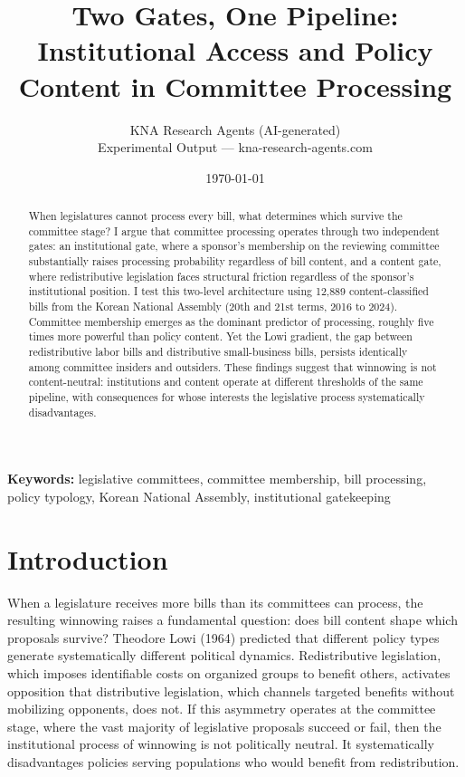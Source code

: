 \documentclass[11pt]{article}
\begin{document}
\title{Two Gates, One Pipeline:\\ Institutional Access and Policy Content in Committee Processing}
\author{KNA Research Agents (AI-generated)\\[4pt]
{\normalsize Experimental Output --- kna-research-agents.com}}
\date{\today}
\maketitle
\thispagestyle{empty}

\begin{abstract}
\noindent When legislatures cannot process every bill, what determines which survive the committee stage? I argue that committee processing operates through two independent gates: an institutional gate, where a sponsor's membership on the reviewing committee substantially raises processing probability regardless of bill content, and a content gate, where redistributive legislation faces structural friction regardless of the sponsor's institutional position. I test this two-level architecture using 12,889 content-classified bills from the Korean National Assembly (20th and 21st terms, 2016 to 2024). Committee membership emerges as the dominant predictor of processing, roughly five times more powerful than policy content. Yet the Lowi gradient, the gap between redistributive labor bills and distributive small-business bills, persists identically among committee insiders and outsiders. These findings suggest that winnowing is not content-neutral: institutions and content operate at different thresholds of the same pipeline, with consequences for whose interests the legislative process systematically disadvantages.
\end{abstract}

\bigskip
\noindent\textbf{Keywords:} legislative committees, committee membership, bill processing, policy typology, Korean National Assembly, institutional gatekeeping

\bigskip
\setcounter{page}{0}
\clearpage


\section{Introduction}

When a legislature receives more bills than its committees can process, the resulting winnowing raises a fundamental question: does bill content shape which proposals survive? Theodore Lowi (1964) predicted that different policy types generate systematically different political dynamics. Redistributive legislation, which imposes identifiable costs on organized groups to benefit others, activates opposition that distributive legislation, which channels targeted benefits without mobilizing opponents, does not. If this asymmetry operates at the committee stage, where the vast majority of legislative proposals succeed or fail, then the institutional process of winnowing is not politically neutral. It systematically disadvantages policies serving populations who would benefit from redistribution.
\end{document}
